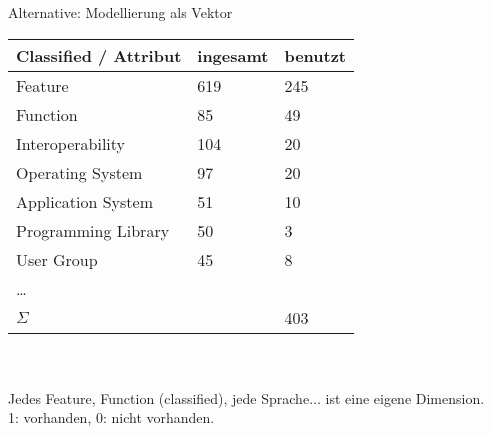 \documentclass[aspectratio=1610]{beamer}
\begin{document}

\begin{frame}{Alternative: Modellierung als Vektor}
\begin{tabular}{lll}
\toprule
Classified / Attribut		&ingesamt	&benutzt\\
\midrule
Feature						&619		&245\\
Function					&85			&49\\	
Interoperability			&104		&20\\
Operating System			&97			&20\\
Application System			&51			&10\\
Programming Library			&50			&3\\
User Group					&45			&8\\
\ldots\\
\midrule
$\Sigma$					&			&403\\
\bottomrule
\end{tabular}
~\\~\\
Jedes Feature, Function (classified), jede Sprache$\ldots$ ist eine eigene Dimension.\\
1: vorhanden, 0: nicht vorhanden.\\
\end{frame}
\end{document}
